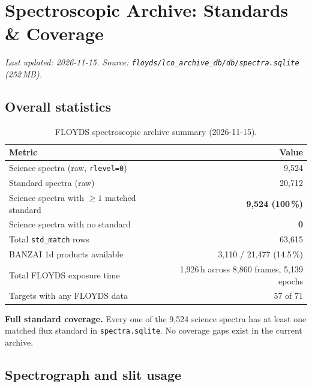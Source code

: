 \documentclass[12pt,a4paper]{article}
\begin{document}

\section{Spectroscopic Archive: Standards \& Coverage}
\label{sec:spec-archive}

\textit{Last updated: 2026-11-15. Source:
\texttt{floyds/lco\_archive\_db/db/spectra.sqlite} (252\,MB).}

\subsection{Overall statistics}

\begin{table}[h!]
\centering
\small
\begin{tabular}{lr}
\toprule
Metric & Value \\
\midrule
Science spectra (raw, \texttt{rlevel=0}) & 9{,}524 \\
Standard spectra (raw) & 20{,}712 \\
Science spectra with $\geq 1$ matched standard & \textbf{9{,}524 (100\,\%)} \\
Science spectra with no standard & \textbf{0} \\
Total \texttt{std\_match} rows & 63{,}615 \\
BANZAI 1d products available & 3{,}110 / 21{,}477 (14.5\,\%) \\
Total FLOYDS exposure time & 1{,}926\,h across 8{,}860 frames, 5{,}139 epochs \\
Targets with any FLOYDS data & 57 of 71 \\
\bottomrule
\end{tabular}
\caption{FLOYDS spectroscopic archive summary (2026-11-15).}
\end{table}

\begin{notebox}
\textbf{Full standard coverage.}  Every one of the 9{,}524 science spectra has
at least one matched flux standard in \texttt{spectra.sqlite}.  No coverage
gaps exist in the current archive.
\end{notebox}

\subsection{Spectrograph and slit usage}
\end{document}
